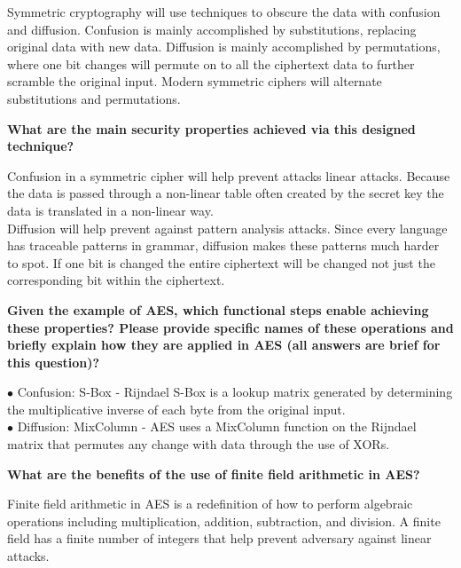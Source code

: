 \documentclass[letterpaper,11pt,notitlepage,fleqn]{article}
\begin{document}
Symmetric cryptography will use techniques to obscure the data with confusion and diffusion. Confusion is mainly accomplished by substitutions, replacing original data with new data. Diffusion is mainly accomplished by permutations, where one bit changes will permute on to all the ciphertext data to further scramble the original input. Modern symmetric ciphers will alternate substitutions and permutations.

\noindent \textbf{What are the main security properties achieved via this designed technique?}

Confusion in a symmetric cipher will help prevent attacks linear attacks. Because the data is passed through a non-linear table often created by the secret key the data is translated in a non-linear way.\\
\indent Diffusion will help prevent against pattern analysis attacks. Since every language has traceable patterns in grammar, diffusion makes these patterns much harder to spot. If one bit is changed the entire ciphertext will be changed not just the corresponding bit within the ciphertext. 

\noindent \textbf{Given the  example  of  AES,  which  functional  steps  enable achieving  these  properties?  Please provide  specific  names  of  these operations  and  briefly  explain  how  they  are  applied  in AES (all answers are brief for this question)?}

\noindent$\bullet$ Confusion: S-Box - Rijndael S-Box is a lookup matrix generated by determining the multiplicative inverse of each byte from the original input. \\
$\bullet$ Diffusion: MixColumn - AES uses a MixColumn function on the Rijndael matrix that permutes any change with data through the use of XORs. 

\noindent \textbf{What are the benefits of the use of finite field arithmetic in AES?}

Finite field arithmetic in AES is a redefinition of how to perform algebraic operations including multiplication, addition, subtraction, and division. A finite field has a finite number of integers that  help prevent adversary against linear attacks. 
\end{document}
